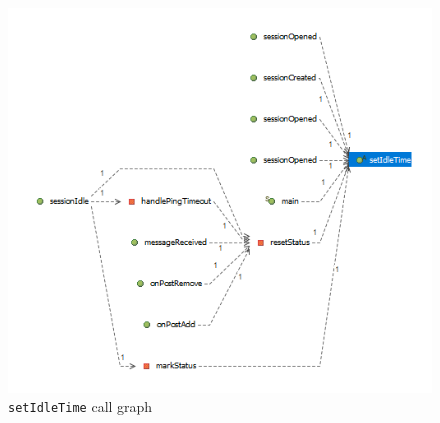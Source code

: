 \begin{figure}[H]
    \centering
    \includegraphics[width=\textwidth]{images/setidletime.png}
    \caption{\texttt{setIdleTime} call graph}
    \label{fig:setidletime}
\end{figure}









